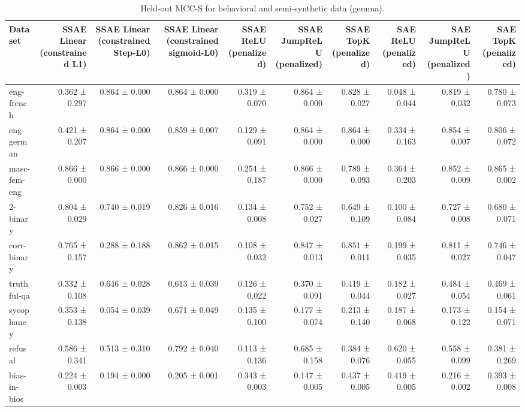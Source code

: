 \begin{table}[t]
\centering
\caption{Held-out MCC-S for behavioral and semi-synthetic data (gemma).}
\label{tab:all-datasets-gemma-mcc-s}
\begin{tabular}{lrrrrrrrrr}
\toprule
Dataset & SSAE Linear (constrained L1) & SSAE Linear (constrained Step-L0) & SSAE Linear (constrained sigmoid-L0) & SSAE ReLU (penalized) & SSAE JumpReLU (penalized) & SSAE TopK (penalized) & SAE ReLU (penalized) & SAE JumpReLU (penalized) & SAE TopK (penalized) \\
\midrule
eng-french & 0.362 ± 0.297 & 0.864 ± 0.000 & 0.864 ± 0.000 & 0.319 ± 0.070 & 0.864 ± 0.000 & 0.828 ± 0.027 & 0.048 ± 0.044 & 0.819 ± 0.032 & 0.780 ± 0.073 \\
eng-german & 0.421 ± 0.207 & 0.864 ± 0.000 & 0.859 ± 0.007 & 0.129 ± 0.091 & 0.864 ± 0.000 & 0.864 ± 0.000 & 0.334 ± 0.163 & 0.854 ± 0.007 & 0.806 ± 0.072 \\
masc-fem-eng & 0.866 ± 0.000 & 0.866 ± 0.000 & 0.866 ± 0.000 & 0.254 ± 0.187 & 0.866 ± 0.000 & 0.789 ± 0.093 & 0.364 ± 0.203 & 0.852 ± 0.009 & 0.865 ± 0.002 \\
2-binary & 0.804 ± 0.029 & 0.740 ± 0.019 & 0.826 ± 0.016 & 0.134 ± 0.008 & 0.752 ± 0.027 & 0.649 ± 0.109 & 0.100 ± 0.084 & 0.727 ± 0.008 & 0.680 ± 0.071 \\
corr-binary & 0.765 ± 0.157 & 0.288 ± 0.188 & 0.862 ± 0.015 & 0.108 ± 0.032 & 0.847 ± 0.013 & 0.851 ± 0.011 & 0.199 ± 0.035 & 0.811 ± 0.027 & 0.746 ± 0.047 \\
truthful-qa & 0.332 ± 0.108 & 0.646 ± 0.028 & 0.613 ± 0.039 & 0.126 ± 0.022 & 0.370 ± 0.091 & 0.419 ± 0.044 & 0.182 ± 0.027 & 0.484 ± 0.054 & 0.469 ± 0.061 \\
sycophancy & 0.353 ± 0.138 & 0.054 ± 0.039 & 0.671 ± 0.049 & 0.135 ± 0.100 & 0.177 ± 0.074 & 0.213 ± 0.140 & 0.187 ± 0.068 & 0.173 ± 0.122 & 0.154 ± 0.071 \\
refusal & 0.586 ± 0.341 & 0.513 ± 0.310 & 0.792 ± 0.040 & 0.113 ± 0.136 & 0.685 ± 0.158 & 0.384 ± 0.076 & 0.620 ± 0.055 & 0.558 ± 0.099 & 0.381 ± 0.269 \\
bias-in-bios & 0.224 ± 0.003 & 0.194 ± 0.000 & 0.205 ± 0.001 & 0.343 ± 0.003 & 0.147 ± 0.005 & 0.437 ± 0.005 & 0.419 ± 0.005 & 0.216 ± 0.002 & 0.393 ± 0.008 \\
\bottomrule
\end{tabular}
\end{table}
